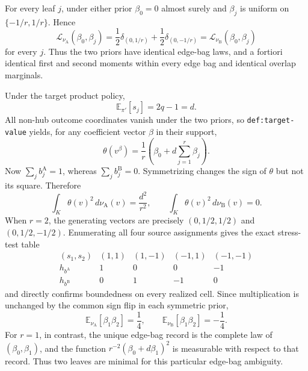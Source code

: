 For every leaf \(j\), under either prior \(\beta_0=0\) almost surely and \(\beta_j\) is uniform on \(\{-1/r,1/r\}\).  Hence
\[
 \mathcal L_{\nu_{\mathrm A}}(\beta_0,\beta_j)
 =\frac12\delta_{(0,1/r)}+\frac12\delta_{(0,-1/r)}
 =\mathcal L_{\nu_{\mathrm B}}(\beta_0,\beta_j)
\]
for every \(j\).  Thus the two priors have identical edge-bag laws, and a fortiori identical first and second moments within every edge bag and identical overlap marginals.

Under the target product policy,
\[
 \mathbb E_{\pi'}[s_j]=2q-1=d.
\]
All non-hub outcome coordinates vanish under the two priors, so \texttt{def:target-value} yields, for any coefficient vector \(\beta\) in their support,
\[
 \theta(v^\beta)=\frac1r\left(\beta_0+d\sum_{j=1}^r\beta_j\right).
\]
Now \(\sum_jb_j^{\mathrm A}=1\), whereas \(\sum_jb_j^{\mathrm B}=0\).  Symmetrizing changes the sign of \(\theta\) but not its square.  Therefore
\[
 \int_K\theta(v)^2\,d\nu_{\mathrm A}(v)=\frac{d^2}{r^2},
 \qquad
 \int_K\theta(v)^2\,d\nu_{\mathrm B}(v)=0.
\]
When \(r=2\), the generating vectors are precisely \((0,1/2,1/2)\) and \((0,1/2,-1/2)\).  Enumerating all four source assignments gives the exact stress-test table
\[
\begin{array}{c|rrrr}
 (s_1,s_2)&(1,1)&(1,-1)&(-1,1)&(-1,-1)\\ \hline
 h_{b^{\mathrm A}}&1&0&0&-1\\
 h_{b^{\mathrm B}}&0&1&-1&0
\end{array}
\]
and directly confirms boundedness on every realized cell.  Since multiplication is unchanged by the common sign flip in each symmetric prior,
\[
 \mathbb E_{\nu_{\mathrm A}}[\beta_1\beta_2]=\frac14,
 \qquad
 \mathbb E_{\nu_{\mathrm B}}[\beta_1\beta_2]=-\frac14.
\]
For \(r=1\), in contrast, the unique edge-bag record is the complete law of \((\beta_0,\beta_1)\), and the function \(r^{-2}(\beta_0+d\beta_1)^2\) is measurable with respect to that record.  Thus two leaves are minimal for this particular edge-bag ambiguity.

